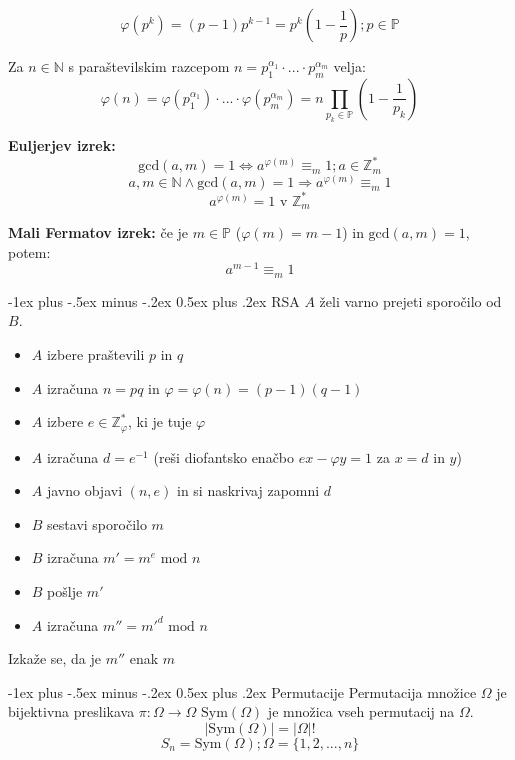 \documentclass[10pt,landscape]{article}
\makeatletter
\renewcommand{\section}{\@startsection{section}{1}{0mm}%
                                {-1ex plus -.5ex minus -.2ex}%
                                {0.5ex plus .2ex}%
                                {\normalfont\large\bfseries}}
\makeatother
\begin{document}
\begin{multicols}{3}
\[\varphi(p^k) = (p-1)p^{k-1} = p^k\left(1-\frac{1}{p}\right); p \in \mathbb{P}\]

Za $n \in \mathbb{N}$ s paraštevilskim razcepom $ n = p_1^{\alpha_1} \cdot ... \cdot p_m^{\alpha_m}$ velja:
\[\varphi(n) = \varphi(p_1^{\alpha_1}) \cdot ... \cdot \varphi(p_m^{\alpha_m}) = n \prod_{ p_k \in \mathbb{P}} \left(1-\frac{1}{p_k} \right) \]

\textbf{Euljerjev izrek:}
\[\textrm{gcd}(a, m) = 1 \Leftrightarrow a^{\varphi(m)} \equiv_m 1; a \in \mathbb{Z}_m^*\]
\[a,m \in \mathbb{N} \wedge \textrm{gcd}(a, m) = 1 \Rightarrow a^{\varphi(m)} \equiv_m 1\]
\[a^{\varphi(m)} = 1 \text{ v } \mathbb{Z}_m^*\]

\textbf{Mali Fermatov izrek:} če je $m \in \mathbb{P}$ ($\varphi(m) = m-1$) in $\textrm{gcd}(a,m) = 1$, potem:
\[a^{m-1} \equiv_m 1\]

\section{RSA}
$A$ želi varno prejeti sporočilo od $B$.
\begin{itemize}
    \item $A$ izbere praštevili $p$ in $q$
    \item $A$ izračuna $n = pq$ in $\varphi = \varphi(n) = (p-1)(q-1)$
    \item $A$ izbere $e \in \mathbb{Z}_{\varphi}^*$, ki je tuje $\varphi$
    \item $A$ izračuna $d = e^{-1}$ (reši diofantsko enačbo $ex - \varphi y = 1$ za $x=d$ in $y$)
    \item $A$ javno objavi $(n, e)$ in si naskrivaj zapomni $d$
    \item $B$ sestavi sporočilo $m$
    \item $B$ izračuna $m' = m^e \textrm{ mod } n$
    \item $B$ pošlje $m'$
    \item $A$ izračuna $m'' = m'^d \textrm{ mod } n$ 
\end{itemize}
Izkaže se, da je $m''$ enak $m$

\section{Permutacije}
Permutacija množice $\Omega$ je bijektivna preslikava $\pi: \Omega \rightarrow \Omega$
$\textrm{Sym}(\Omega)$ je množica vseh permutacij na $\Omega$.
\[|\textrm{Sym}(\Omega)| = |\Omega|!\]
\[S_n = \textrm{Sym}(\Omega); \Omega = \{1,2,...,n\}\]


\end{multicols}
\end{document}

